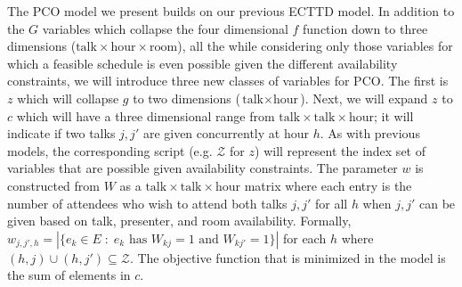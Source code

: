 \documentclass{svjour3}                     %
\begin{document}
The PCO model we present builds on our previous ECTTD model. 
In addition to the $G$ variables which collapse the four dimensional $f$ function down to three dimensions ($\text{talk} \times \text{hour} \times \text{room}$), all the while considering only those variables for which a feasible schedule is even possible given the different availability constraints, we will introduce three new classes of variables for PCO. 
The first is $z$ which will collapse $g$ to two dimensions ($\text{talk} \times \text{hour}$). 
Next, we will expand $z$ to $c$ which will have a three dimensional range from $\text{talk} \times \text{talk} \times \text{hour}$; it will indicate if two talks $j, j'$ are given concurrently at hour $h$. 
As with previous models, the corresponding script (e.g. $\mathcal Z$ for $z$) will represent the index set of variables that are possible given availability constraints. 
The parameter $w$ is constructed from $W$ as a $\text{talk} \times \text{talk} \times \text{hour}$ matrix where each entry is the number of attendees who wish to attend both talks $j,j'$ for all $h$ when $j,j'$ can be given based on talk, presenter, and room availability. 
Formally, $w_{j,j',h} = |\{e_k \in E \; : \; e_k \text{ has } W_{kj} = 1 \text{ and } W_{kj'} = 1 \}|$ for each $h$ where $(h,j)\cup(h,j') \subseteq \mathcal{Z}$. 
The objective function that is minimized in the model is the sum of elements in $c$.
\end{document}
